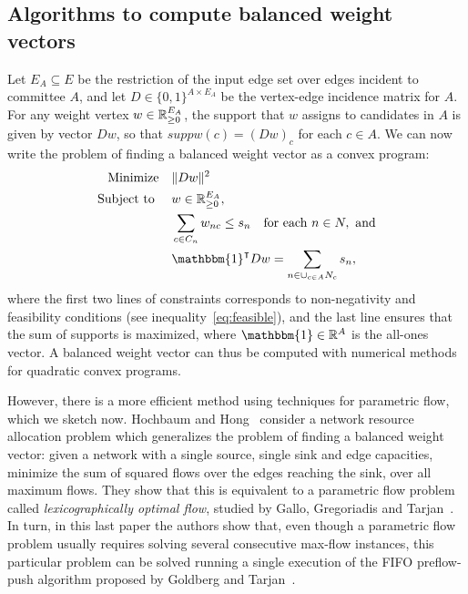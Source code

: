 \subsection{Algorithms to compute balanced weight vectors}

Let $E_A\subseteq E$ be the restriction of the input edge set over edges incident to committee $A$, and let $D\in\{0,1\}^{A\times E_A}$ be the vertex-edge incidence matrix for $A$. 
For any weight vertex $w\in\mathbb{R}_{\geq 0}^{E_A}$, the support that $w$ assigns to candidates in $A$ is given by vector $Dw$, so that $suppw(c)=(Dw)_c$ for each $c\in A$. 
We can now write the problem of finding a balanced weight vector as a convex program:
\begin{align*}
    \text{Minimize} \quad & \|Dw\|^2 \\
    \text{Subject to } \quad & w\in\R^{E_A}, \\
    & \sum_{c\in C_n} w_{nc} \leq s_n \quad \text{for each } n\in N, \text{ and} \\
    & \mathbbm{1}^{\intercal} Dw = \sum_{n\in \cup_{c\in A} N_c} s_n,
\end{align*}
where the first two lines of constraints corresponds to non-negativity and feasibility conditions (see inequality~\ref{eq:feasible}), and the last line ensures that the sum of supports is maximized, where $\mathbbm{1}\in\mathbb{R}^A$ is the all-ones vector. 
A balanced weight vector can thus be computed with numerical methods for quadratic convex programs.

However, there is a more efficient method using techniques for parametric flow, which we sketch now. Hochbaum and Hong~\cite[Section 6]{hochbaum1995strongly} consider a network resource allocation problem which generalizes the problem of finding a balanced weight vector: given a network with a single source, single sink and edge capacities, minimize the sum of squared flows over the edges reaching the sink, over all maximum flows. 
They show that this is equivalent to a parametric flow problem called \emph{lexicographically optimal flow}, studied by Gallo, Gregoriadis and Tarjan~\cite{gallo1989fast}. 
In turn, in this last paper the authors show that, even though a parametric flow problem usually requires solving several consecutive max-flow instances, this particular problem can be solved running a single execution of the FIFO preflow-push algorithm proposed by Goldberg and Tarjan~\cite{goldberg1988new}.

